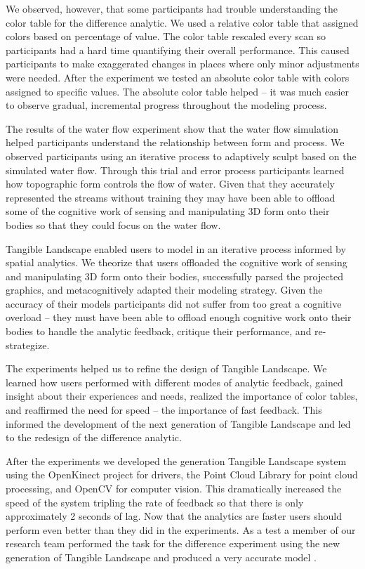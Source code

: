 \documentclass[prodmode,acmtochi]{acmsmall} %
\begin{document}
We observed, however, that some participants had trouble understanding
the color table for the difference analytic. 
We used a relative color table 
that assigned colors based on percentage of value.
The color table rescaled every scan 
so participants had a hard time quantifying their overall performance.
This caused participants to make exaggerated changes in places
where only minor adjustments were needed.
%
After the experiment we tested an absolute color table
with colors assigned to specific values.
The absolute color table helped -- it was much easier 
to observe gradual, incremental progress throughout the modeling process.

The results of the water flow experiment show 
that the water flow simulation helped participants 
understand the relationship between form and process.
We observed participants using an iterative process
to adaptively sculpt based on the simulated water flow. 
Through this trial and error process 
participants learned how
topographic form controls the flow of water.
%
Given that they accurately represented the streams without training
they may have been able to offload 
some of the cognitive work of sensing and manipulating 
3D form onto their bodies so that 
they could focus on the water flow. 

Tangible Landscape enabled users 
to model in an iterative process informed by spatial analytics. %
%
We theorize that users offloaded the cognitive work 
of sensing and manipulating 3D form onto their bodies,
successfully parsed the projected graphics,
and metacognitively adapted their modeling strategy.
%
Given the accuracy of their models 
participants did not suffer from too great a cognitive overload 
-- they must have been able to offload enough cognitive work onto their bodies
to handle the analytic feedback, critique their performance, and re-strategize.

The experiments helped us to refine the design of Tangible Landscape. 
%
We learned how users performed with different modes of analytic feedback, 
gained insight about their experiences and needs,
realized the importance of color tables, 
and reaffirmed the need for speed -- the importance of fast feedback. 
%
This informed the development of the next generation of Tangible Landscape 
and led to the redesign of the difference analytic. 

After the experiments
we developed the  generation Tangible Landscape system
using 
the OpenKinect project for drivers,
the Point Cloud Library for point cloud processing, 
and OpenCV for computer vision. 
%
This dramatically increased the speed of the system
tripling the rate of feedback
so that there is only approximately 2 seconds of lag. 
%
Now that the analytics are faster 
users should perform even better than they did in the experiments.
%
As a test a member of our research team 
performed the task for the difference experiment 
using the new generation of Tangible Landscape
and produced a very accurate model \cite{ncsu_geoforall_2016}. 
\end{document}
